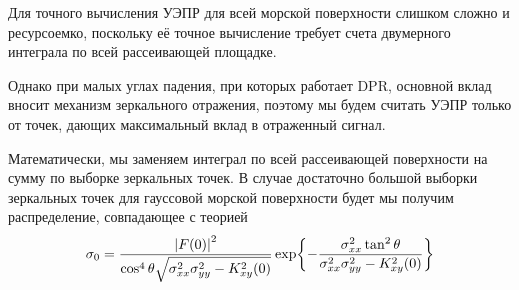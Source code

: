 \documentclass{article}
\begin{document}




Для точного вычисления УЭПР для всей морской поверхности слишком сложно и
ресурсоемко, поскольку её точное вычисление требует счета двумерного интеграла
по всей рассеивающей площадке.  

Однако при малых углах падения, при которых
работает DPR, основной вклад вносит механизм зеркального отражения, поэтому мы
будем считать УЭПР только от точек, дающих максимальный вклад в отраженный
сигнал. %


Математически, мы заменяем интеграл по всей рассеивающей поверхности на
сумму по выборке зеркальных точек. В случае достаточно большой выборки
зеркальных точек для гауссовой морской
поверхности будет мы получим распределение, совпадающее с теорией
\begin{equation}
    \label{eq:sigma0_theory}
    \sigma_0 = \frac{\abs{F(0)}^2}{\cos^4\theta \sqrt{\sigma_{xx}^2
    \sigma_{yy}^2 - K_{xy}^2(0)}} \exp{- \frac{\sigma^2_{xx}
    \tan^2\theta}{\sigma_{xx}^2 \sigma_{yy}^2 - K_{xy}^2(0)}}
\end{equation}
\end{document}
